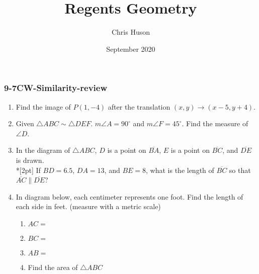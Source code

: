 \documentclass[12pt, twoside]{article}
\title{Regents Geometry}
\author{Chris Huson}
\date{September 2020}
\begin{document}
\subsubsection*{9-7CW-Similarity-review}
\begin{enumerate}
\item Find the image of $P(1,-4)$ after the translation $(x,y) \rightarrow (x-5,y+4)$. \vspace{2cm}
  
\item Given $\triangle ABC \sim \triangle DEF$. $m\angle A = 90^\circ$ and $m\angle F = 45^\circ$. Find the measure of $\angle D$. \vspace{2cm}

\item In the diagram of $\triangle ABC$, $D$ is a point on $\overline{BA}$, $E$ is a point on $\overline{BC}$, and $\overline{DE}$ is drawn. \\*[2pt] 
  If $BD=6.5$, $DA=13$, and $BE=8$, what is the length of $\overline{BC}$ so that $\overline{AC} \parallel \overline{DE}$?
  \begin{flushright}
    \end{flushright}

\item In diagram below, each centimeter represents one foot. Find the length of each side in feet. (measure with a metric scale)
  \begin{multicols}{2}
    \begin{enumerate}[itemsep=1.5cm]
      \item $AC=$
      \item $BC=$
      \item $AB=$ 
      \item Find the area of $\triangle ABC$
    \end{enumerate}
  \begin{center}
  \end{center}
\end{multicols}%


\end{enumerate}
\end{document}
